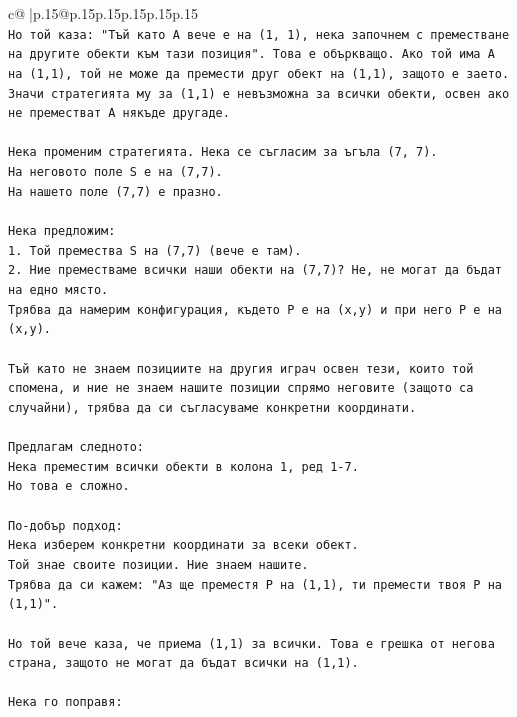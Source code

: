 \documentclass{article}
\begin{document}
{\begin{supertabular}{c@{$\;$}|p{.15\linewidth}@{}p{.15\linewidth}p{.15\linewidth}p{.15\linewidth}p{.15\linewidth}p{.15\linewidth}}
{{{\\ 
\texttt{Но той каза: "Тъй като A вече е на (1, 1), нека започнем с преместване на другите обекти към тази позиция". Това е объркващо. Ако той има A на (1,1), той не може да премести друг обект на (1,1), защото е заето.} \\
\texttt{Значи стратегията му за (1,1) е невъзможна за всички обекти, освен ако не преместват A някъде другаде.} \\
\\ 
\texttt{Нека променим стратегията. Нека се съгласим за ъгъла (7, 7).} \\
\texttt{На неговото поле S е на (7,7).} \\
\texttt{На нашето поле (7,7) е празно.} \\
\\ 
\texttt{Нека предложим:} \\
\texttt{1. Той премества S на (7,7) (вече е там).} \\
\texttt{2. Ние преместваме всички наши обекти на (7,7)? Не, не могат да бъдат на едно място.} \\
\texttt{Трябва да намерим конфигурация, където P е на (x,y) и при него P е на (x,y).} \\
\\ 
\texttt{Тъй като не знаем позициите на другия играч освен тези, които той спомена, и ние не знаем нашите позиции спрямо неговите (защото са случайни), трябва да си съгласуваме конкретни координати.} \\
\\ 
\texttt{Предлагам следното:} \\
\texttt{Нека преместим всички обекти в колона 1, ред 1{-}7.} \\
\texttt{Но това е сложно.} \\
\\ 
\texttt{По{-}добър подход:} \\
\texttt{Нека изберем конкретни координати за всеки обект.} \\
\texttt{Той знае своите позиции. Ние знаем нашите.} \\
\texttt{Трябва да си кажем: "Аз ще преместя P на (1,1), ти премести твоя P на (1,1)".} \\
\\ 
\texttt{Но той вече каза, че приема (1,1) за всички. Това е грешка от негова страна, защото не могат да бъдат всички на (1,1).} \\
\\ 
\texttt{Нека го поправя:} \\
}}}
\end{supertabular}}
\end{document}
